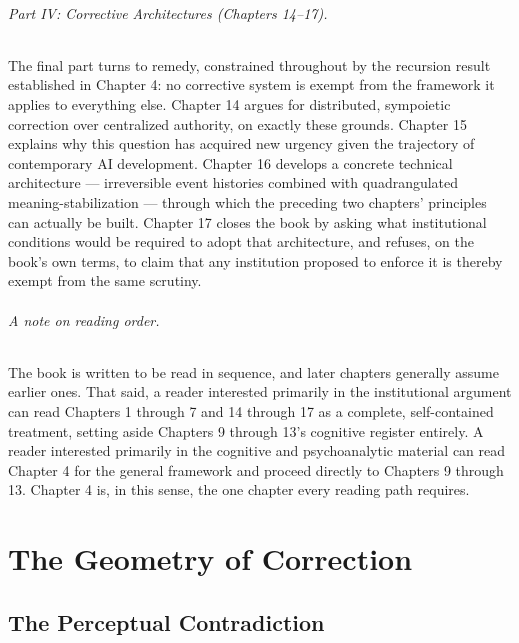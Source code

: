\documentclass[12pt,a4paper]{book}
\begin{document}
\paragraph{Part IV: Corrective Architectures (Chapters 14–17).} The final part turns to remedy, constrained throughout by the recursion result established in Chapter 4: no corrective system is exempt from the framework it applies to everything else. Chapter 14 argues for distributed, sympoietic correction over centralized authority, on exactly these grounds. Chapter 15 explains why this question has acquired new urgency given the trajectory of contemporary AI development. Chapter 16 develops a concrete technical architecture — irreversible event histories combined with quadrangulated meaning-stabilization — through which the preceding two chapters' principles can actually be built. Chapter 17 closes the book by asking what institutional conditions would be required to adopt that architecture, and refuses, on the book's own terms, to claim that any institution proposed to enforce it is thereby exempt from the same scrutiny.

\paragraph{A note on reading order.} The book is written to be read in sequence, and later chapters generally assume earlier ones. That said, a reader interested primarily in the institutional argument can read Chapters 1 through 7 and 14 through 17 as a complete, self-contained treatment, setting aside Chapters 9 through 13's cognitive register entirely. A reader interested primarily in the cognitive and psychoanalytic material can read Chapter 4 for the general framework and proceed directly to Chapters 9 through 13. Chapter 4 is, in this sense, the one chapter every reading path requires.

\tableofcontents

\mainmatter

\part{The Geometry of Correction}

\chapter{The Perceptual Contradiction}
\end{document}
